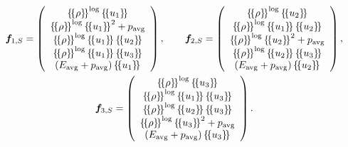 \documentclass{svjour3}                     %
\newcommand{\LRp}[1]{\left( #1 \right)}
\newcommand{\LRc}[1]{\left\{ #1 \right\}}
\newcommand{\avg}[1] {\ensuremath{\LRc{\!\LRc{#1}\!}}}
\begin{document}
\begin{gather*}
\bm{f}_{1,S} = \LRp{\begin{array}{c}
\avg{\rho}^{\log}\avg{u_1}\\
\avg{\rho}^{\log}\avg{u_1}^2 + p_{\rm avg}\\
\avg{\rho}^{\log}\avg{u_1}\avg{u_2}\\
\avg{\rho}^{\log}\avg{u_1}\avg{u_3}\\
(E_{\rm avg}+ p_{\rm avg})\avg{u_1}\\
\end{array}}, 
\qquad 
\bm{f}_{2,S} = \LRp{\begin{array}{c}
\avg{\rho}^{\log}\avg{u_2}\\
\avg{\rho}^{\log}\avg{u_1}\avg{u_2}\\
\avg{\rho}^{\log}\avg{u_2}^2 + p_{\rm avg}\\
\avg{\rho}^{\log}\avg{u_2}\avg{u_3}\\
(E_{\rm avg}+ p_{\rm avg})\avg{u_2}\\
\end{array}},\\
\bm{f}_{3,S} = \LRp{\begin{array}{c}
\avg{\rho}^{\log}\avg{u_3}\\
\avg{\rho}^{\log}\avg{u_1}\avg{u_3}\\
\avg{\rho}^{\log}\avg{u_2}\avg{u_3}\\
\avg{\rho}^{\log}\avg{u_3}^2 + p_{\rm avg}\\
(E_{\rm avg}+ p_{\rm avg})\avg{u_3}\\
\end{array}}. \nonumber
\end{gather*}
\end{document}
